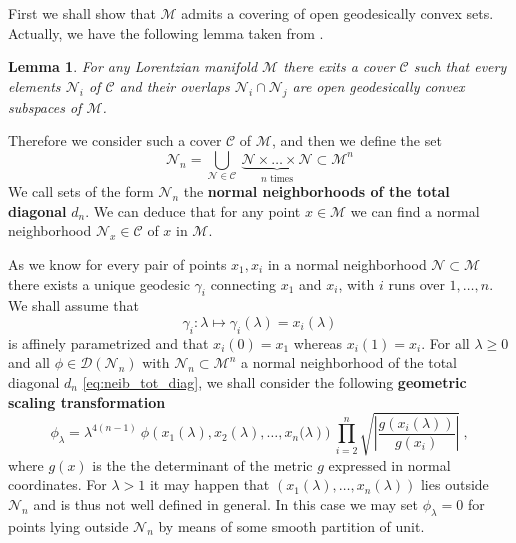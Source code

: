 \documentclass[11pt]{book}
\newcommand{\abs}[1]{\left|#1\right|}
\newcommand{\Ccal}{\mathcal{C}}
\newcommand{\Dcal}{\mathcal{D}}
\newcommand{\Mcal}{\mathcal{M}}
\newcommand{\Ncal}{\mathcal{N}}
\theoremstyle{break}
\newtheorem{lemma}{Lemma}[chapter]
\begin{document}
First we shall show that $\Mcal$ admits a covering of open geodesically convex sets. Actually, we have the following lemma taken from \cite{ONEIL_1983}.


\begin{lemma}
For any Lorentzian manifold $\Mcal$ there exits a cover $\Ccal$ such that every elements $\Ncal_i$ of $\Ccal$ and their overlaps $\Ncal_i \cap \Ncal_j$ are open geodesically convex subspaces of $\Mcal$.
\end{lemma}


Therefore we consider such a cover $\Ccal$ of $\Mcal$, and then we define the set
%
\begin{equation}
\Ncal_{n} = \bigcup_{\Ncal\in\Ccal} \ \underbrace{\Ncal \times \dots \times \Ncal}_{n \mbox{ times}} \subset \Mcal^n 
\label{eq:neib_tot_diag}
\end{equation}
%
We call sets of the form $\Ncal_n$ the \textbf{normal neighborhoods of the total diagonal} $d_n$. We can deduce that for any point $x \in \Mcal$ we can find a normal neighborhood $\Ncal_x \in \Ccal$ of $x$ in $\Mcal$. 


As we know for every pair of points $x_1,x_i$ in a normal neighborhood $\Ncal \subset \Mcal$ there exists a unique geodesic $\gamma_i$ connecting $x_1$ and $x_i$, with $i$ runs over $1,\dots,n$. We shall assume that
%
\begin{equation*}
\gamma_i : \lambda \mapsto \gamma_i(\lambda) = x_i(\lambda) 
\end{equation*}
%
is affinely parametrized and that $x_i(0) =x_1$ whereas $x_i(1) = x_i$. For all $\lambda \geq 0$ and all $\phi \in \Dcal(\Ncal_{n})$ with $\Ncal_n \subset \Mcal^n$ a normal neighborhood of the total diagonal $d_n$ \eqref{eq:neib_tot_diag}, we shall consider the following \textbf{geometric scaling transformation} 
%
\begin{equation}
\phi_\lambda = \lambda^{4(n-1)} \ \phi\left(x_1(\lambda ),x_2(\lambda ),\dots,x_n(\lambda\right)) \ \prod_{i=2}^n \sqrt{\abs{\frac{g(x_i(\lambda ))}{g(x_i)}}} \ ,
\label{eq:geo_scaling_transfo}
\end{equation}
%
where $g(x)$ is the the determinant of the metric $g$ expressed in normal coordinates. For $\lambda > 1$ it may happen that $(x_1(\lambda),\dots, x_n(\lambda))$ lies outside $\Ncal_n$ and is thus not well defined in general. In this case we may set $\phi_\lambda = 0$  for points lying outside $\Ncal_n$ by means of some smooth partition of unit.
\end{document}
